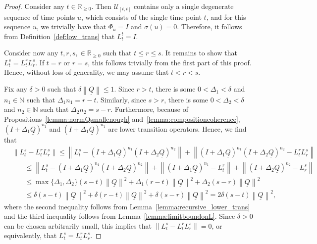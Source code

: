 \documentclass[10pt,a4paper]{paper}
\theoremstyle{definition}
\newcommand{\nats}{\mathbb{N}}
\newcommand{\reals}{\mathbb{R}}
\newcommand{\realsnonneg}{\reals_{\geq 0}}
\newcommand{\lrate}{\underline{Q}}
\newcommand{\norm}[1]{\left\lVert #1 \right\rVert}
\begin{document}
\proplowertranssystemissystem*
\begin{proof}
Consider any $t\in\realsnonneg$. Then $\mathcal{U}_{[t,t]}$ contains only a single degenerate sequence of time points $u$, which consists of the single time point $t$, and for this sequence $u$, we trivially have that $\Phi_u=I$ and $\sigma(u)=0$. Therefore, it follows from Definition~\ref{def:low_trans} that $L_t^t=I$.


Consider now any $t,r,s,\in\realsnonneg$ such that $t\leq r\leq s$. It remains to show that $L_t^s=L_t^rL_r^s$. If $t=r$ or $r=s$, this follows trivially from the first part of this proof. Hence, without loss of generality, we may assume that $t<r<s$.

Fix any $\delta>0$ such that $\delta\norm{\lrate}\leq1$. Since $r>t$, there is some $0<\Delta_1<\delta$ and $n_1\in\nats$ such that $\Delta_1 n_1=r-t$. Similarly, since $s>r$, there is some $0<\Delta_2<\delta$ and $n_2\in\nats$ such that $\Delta_2 n_2=s-r$. Furthermore, because of Propositions~\ref{lemma:normQsmallenough} and~\ref{lemma:compositioncoherence}, $(I+\Delta_1\lrate)^{n_1}$ and $(I+\Delta_1\lrate)^{n_1}$ are lower transition operators. Hence, we find that
\begin{align*}
&\norm{L_t^s-L_t^rL_r^s}
\leq
\norm{L_t^s-(I+\Delta_1\lrate)^{n_1}(I+\Delta_2\lrate)^{n_2}}
+
\norm{(I+\Delta_1\lrate)^{n_1}(I+\Delta_2\lrate)^{n_2}-L_t^rL_r^s}\\
&~~~~~~~~\leq
\norm{L_t^s-(I+\Delta_1\lrate)^{n_1}(I+\Delta_2\lrate)^{n_2}}
+
\norm{(I+\Delta_1\lrate)^{n_1}-L_t^r}
+
\norm{(I+\Delta_2\lrate)^{n_2}-L_r^s}\\
&~~~~~~~~\leq
\max\{\Delta_1,\Delta_2\}(s-t)\norm{\lrate}^2
+
\Delta_1(r-t)\norm{\lrate}^2
+
\Delta_2(s-r)\norm{\lrate}^2\\
&~~~~~~~~\leq
\delta(s-t)\norm{\lrate}^2
+
\delta(r-t)\norm{\lrate}^2
+
\delta(s-r)\norm{\lrate}^2
=
2\delta(s-t)\norm{\lrate}^2,
\end{align*}
where the second inequality follows from Lemma~\ref{lemma:recursive_lower_trans} and the third inequality follows from Lemma~\ref{lemma:limitboundonL}. Since $\delta>0$ can be chosen arbitrarily small, this implies that $\norm{L_t^s-L_t^rL_r^s}=0$, or equivalently, that $L_t^s=L_t^rL_r^s$.
\end{proof}
\end{document}
